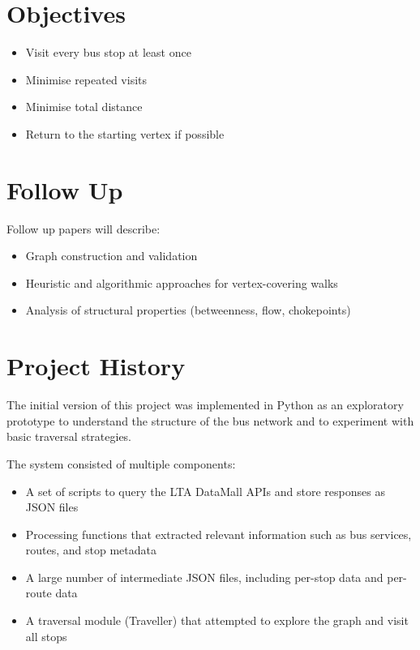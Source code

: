 \documentclass[11pt,a4paper]{article}
\begin{document}
\section{Objectives}

\begin{itemize}
    \item Visit every bus stop at least once
    \item Minimise repeated visits
    \item Minimise total distance
    \item Return to the starting vertex if possible
\end{itemize}

\section{Follow Up}

Follow up papers will describe:

\begin{itemize}
    \item Graph construction and validation
    \item Heuristic and algorithmic approaches for vertex-covering walks
    \item Analysis of structural properties (betweenness, flow, chokepoints)
\end{itemize}

\section{Project History}

The initial version of this project was implemented in Python as an exploratory
prototype to understand the structure of the bus network and to experiment with
basic traversal strategies.

The system consisted of multiple components:

\begin{itemize}
    \item A set of scripts to query the LTA DataMall APIs and store responses as JSON files
    \item Processing functions that extracted relevant information such as bus services,
    routes, and stop metadata
    \item A large number of intermediate JSON files, including per-stop data and per-route data
    \item A traversal module (Traveller) that attempted to explore the graph and visit all stops
\end{itemize}
\end{document}
